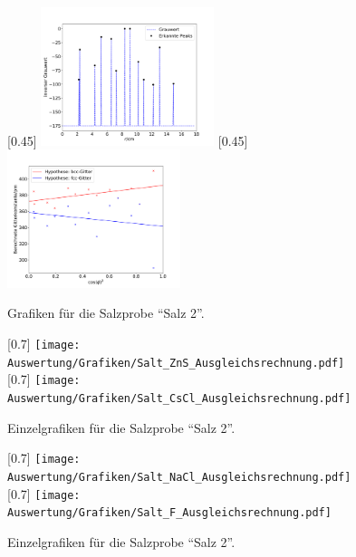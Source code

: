 \begin{figure}[h!]
  \centering
  [0.45\textwidth]{
  \centering
  \includegraphics[width=0.45\textwidth]{Auswertung/Grafiken/Salt_Peaks.pdf}
  }
  [0.45\textwidth]{
  \centering
  \includegraphics[width=0.45\textwidth]{Auswertung/Grafiken/Salt_Ausgleichsrechnung.pdf}
  }\\
  \label{Abb:Salz_Plots}
  \caption{Grafiken für die Salzprobe \enquote{Salz 2}.}
\end{figure}

\begin{figure}[h!]
  \centering
  [0.7\textwidth]{
  \centering
  \texttt{[image: Auswertung/Grafiken/Salt\_ZnS\_Ausgleichsrechnung.pdf]}
  }\\
  [0.7\textwidth]{
  \centering
  \texttt{[image: Auswertung/Grafiken/Salt\_CsCl\_Ausgleichsrechnung.pdf]}
  }\\
  \label{Abb:Salz_Plotsa}
  \caption{Einzelgrafiken für die Salzprobe \enquote{Salz 2}.}
\end{figure}

\begin{figure}[h!]
  \centering
  [0.7\textwidth]{
  \centering
  \texttt{[image: Auswertung/Grafiken/Salt\_NaCl\_Ausgleichsrechnung.pdf]}
  }\\
  [0.7\textwidth]{
  \centering
  \texttt{[image: Auswertung/Grafiken/Salt\_F\_Ausgleichsrechnung.pdf]}
  }\\
  \label{Abb:Salz_Plotsn}
  \caption{Einzelgrafiken für die Salzprobe \enquote{Salz 2}.}
\end{figure}

